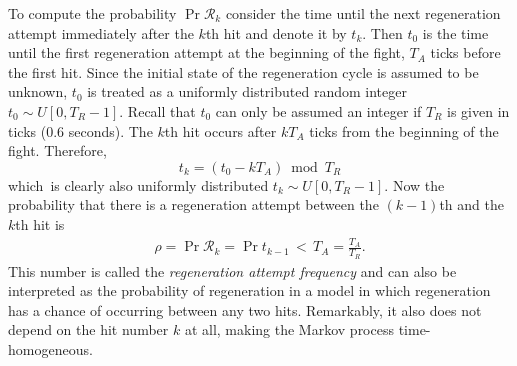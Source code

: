 To compute the probability $\Pr{\mathcal{R}_k}$ consider the time until the next regeneration attempt immediately after the $k$th hit and denote it by $t_k$. Then $t_0$ is the time until the first regeneration attempt at the beginning of the fight, $T_A$ ticks before the first hit. Since the initial state of the regeneration cycle is assumed to be unknown, $t_0$ is treated as a uniformly distributed random integer $t_0\sim U[0,T_R-1]$. Recall that $t_0$ can only be assumed an integer if $T_R$ is given in ticks (0.6 seconds). The $k$th hit occurs after $kT_A$ ticks from the beginning of the fight. Therefore,
\begin{equation}\label{eq:regenDelay}
	t_k = (t_0 - kT_A) \bmod{T_R}
\end{equation}
which is clearly also uniformly distributed $t_k \sim U[0,T_R-1]$. Now the probability that there is a regeneration attempt between the $(k-1)$th and the $k$th hit is
\begin{align}
	\rho = \Pr{\mathcal{R}_k}
	= \Pr{t_{k-1}\,<\,T_A}
	= \frac{T_A}{T_R}.
\end{align}
This number is called the \emph{regeneration attempt frequency} and can also be interpreted as the probability of regeneration in a model in which regeneration has a chance of occurring between any two hits. Remarkably, it also does not depend on the hit number $k$ at all, making the Markov process time-homogeneous.

